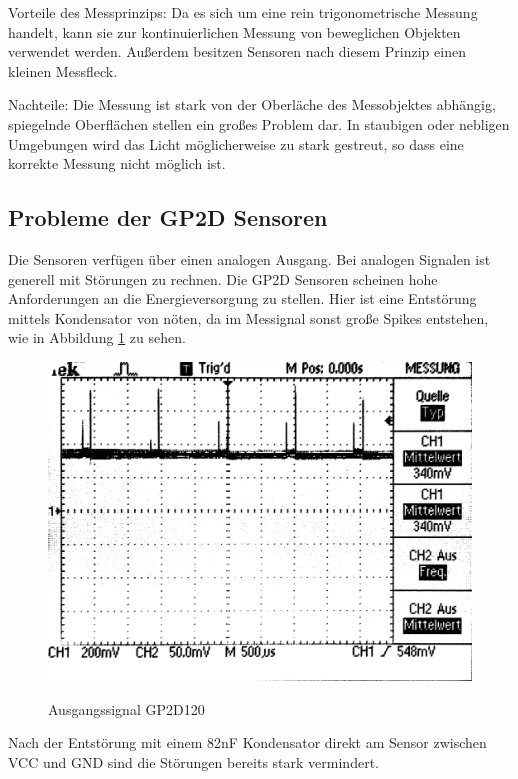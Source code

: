Vorteile des Messprinzips:
Da es sich um eine rein trigonometrische Messung handelt, kann sie zur kontinuierlichen Messung von beweglichen Objekten verwendet werden.
Außerdem besitzen Sensoren nach diesem Prinzip einen kleinen Messfleck.

Nachteile:
Die Messung ist stark von der Oberläche des Messobjektes abhängig, spiegelnde Oberflächen stellen ein großes Problem dar.
In staubigen oder nebligen Umgebungen wird das Licht möglicherweise zu stark gestreut, so dass eine korrekte Messung nicht möglich ist.

\subsection{Probleme der GP2D Sensoren}
Die Sensoren verfügen über einen analogen Ausgang. Bei analogen Signalen ist generell mit Störungen zu rechnen. Die GP2D Sensoren scheinen
hohe Anforderungen an die Energieversorgung zu stellen. Hier ist eine Entstörung mittels Kondensator von nöten, da im Messignal sonst große Spikes
entstehen, wie in Abbildung \ref{fig:IR_spikes} zu sehen.

\begin{figure}[H]
\centering
\includegraphics[width=.8\textwidth]{IR_spikes.png}\\
\caption{Ausgangssignal GP2D120}%
\label{fig:IR_spikes}
\end{figure}

Nach der Entstörung mit einem 82nF Kondensator direkt am Sensor zwischen VCC und GND sind die Störungen bereits stark vermindert.

